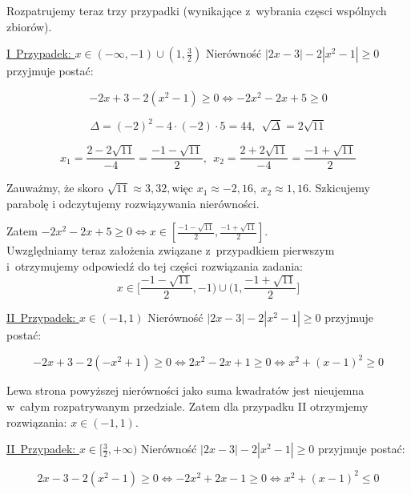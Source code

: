 \begin{rozw}
Rozpatrujemy teraz trzy przypadki (wynikające z~wybrania częsci wspólnych zbiorów).

\underline{I~Przypadek: $x\in (-\infty,-1)\cup (1,\frac{3}{2})$}
Nierówność $|2x-3|-2|x^2-1|\geq 0$ przyjmuje postać:

\[-2x+3 -2(x^2-1) \geq 0 \iff -2x^2-2x+5 \geq 0 \]

\[\Delta = (-2)^2-4\cdot(-2)\cdot5=44, \ \ \sqrt{\Delta}=2\sqrt{11} \]

\[x_1=\frac{2-2\sqrt{11}}{-4}=\frac{-1-\sqrt{11}}{2}, \ \ x_2=\frac{2+2\sqrt{11}}{-4}=\frac{-1+\sqrt{11}}{2}\]

Zauważmy, że skoro $\sqrt{11} \approx 3,32, \text{więc } x_1 \approx -2,16, \ x_2 \approx 1,16$. Szkicujemy parabolę i odczytujemy rozwiązywania nierówności.
\begin{center}
\end{center}
Zatem $-2x^2-2x+5 \geq 0 \iff x\in [\frac{-1-\sqrt{11}}{2},\frac{-1+\sqrt{11}}{2}]$.\\

Uwzględniamy teraz założenia związane z~przypadkiem pierwszym i~otrzymujemy odpowiedź do tej części rozwiązania zadania: 
\[ x\in \Big[\frac{-1-\sqrt{11}}{2},-1\Big) \cup \Big(1, \frac{-1+\sqrt{11}}{2}\Big]\]

\underline{II~Przypadek: $x\in(-1,1)$} Nierówność $|2x-3|-2|x^2-1|\geq 0$ przyjmuje postać:

\[-2x+3-2(-x^2+1)\geq 0 \iff 2x^2-2x+1 \geq 0 \iff x^2 + (x-1)^2 \geq 0 \]

Lewa strona powyższej nierówności jako suma kwadratów jest nieujemna w~całym rozpatrywanym przedziale. Zatem dla przypadku II otrzymjemy rozwiązania: $x \in (-1,1)$.

\underline{II~Przypadek: $x\in[\frac{3}{2},+ \infty)$} Nierówność $|2x-3|-2|x^2-1|\geq 0$ przyjmuje postać:

\[ 2x-3-2(x^2-1)\geq 0 \iff -2x^2+2x-1 \geq 0 \iff x^2 + (x-1)^2 \leq 0 \]


\end{rozw}
